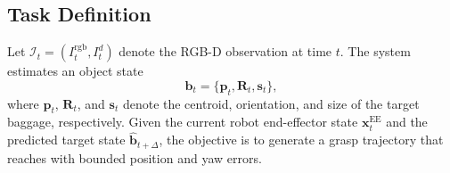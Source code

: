 \subsection{Task Definition}
Let $\mathcal{I}_{t}=(I_{t}^{\text{rgb}},I_{t}^{d})$ denote the RGB-D observation at time $t$. The system estimates an object state
\begin{equation}
\boldsymbol{b}_{t}=\{\boldsymbol{p}_{t},\boldsymbol{R}_{t},\boldsymbol{s}_{t}\},
\end{equation}
where $\boldsymbol{p}_{t}$, $\boldsymbol{R}_{t}$, and $\boldsymbol{s}_{t}$ denote the centroid, orientation, and size of the target baggage, respectively. Given the current robot end-effector state $\boldsymbol{x}^{\text{EE}}_{t}$ and the predicted target state $\widehat{\boldsymbol{b}}_{t+\Delta}$, the objective is to generate a grasp trajectory that reaches  with bounded position and yaw errors.
